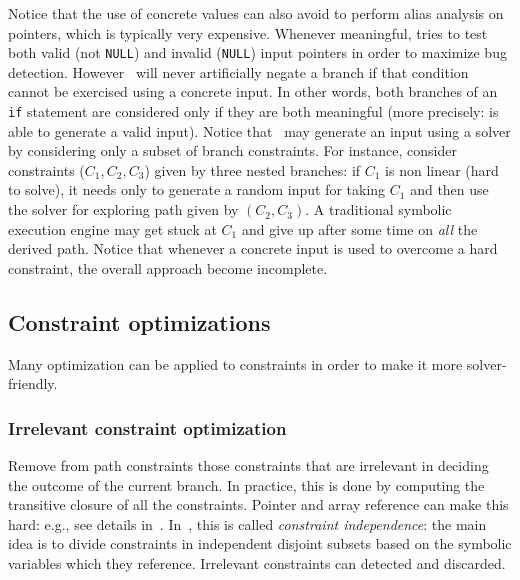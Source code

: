 Notice that the use of concrete values can also avoid to perform alias analysis on pointers, which is typically very expensive. Whenever meaningful, \cite{DART-PLDI05} tries to test both valid (not {\tt NULL}) and invalid ({\tt NULL}) input pointers in order to maximize bug detection. However~\cite{DART-PLDI05} will never artificially negate a branch if that condition cannot be exercised using a concrete input. In other words, both branches of an {\tt if} statement are considered only if they are both meaningful (more precisely: \cite{DART-PLDI05} is able to generate a valid input). Notice that~\cite{DART-PLDI05} may generate an input using a solver by considering only a subset of branch constraints. For instance, consider constraints ($C_1, C_2, C_3$) given by three nested branches: if $C_1$ is non linear (hard to solve), it needs only to generate a random input for taking $C_1$ and then use the solver for exploring path given by $(C_2, C_3)$. A traditional symbolic execution engine may get stuck at $C_1$ and give up after some time on {\em all} the derived path. Notice that whenever a concrete input is used to overcome a hard constraint, the overall approach become incomplete.

\subsection{Constraint optimizations}
\label{constraint-optimizations}


Many optimization can be applied to constraints in order to make it more solver-friendly.

\subsubsection{Irrelevant constraint optimization} Remove from path constraints those constraints that are irrelevant in deciding the outcome of the current branch. In practice, this is done by computing the transitive closure of all the constraints. Pointer and array reference can make this hard: e.g., see details in~\cite{EXE-CCS06,EGL-ISSTA09,CUTE-FSE13}. In~\cite{KLEE-OSDI08}, this is called {\em constraint independence}: the main idea is to divide constraints in independent disjoint subsets based on the symbolic variables which they reference. Irrelevant constraints can detected and discarded.


